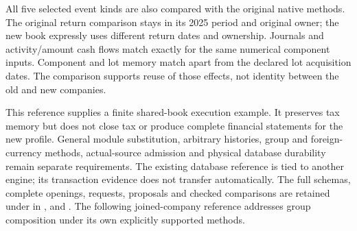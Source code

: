 All five selected event kinds are also compared with the original native
methods. The original return comparison stays in its 2025 period and original
owner; the new book expressly uses different return dates and ownership.
Journals and activity/amount cash flows match exactly for the same numerical
component inputs. Component and lot memory match apart from the declared lot
acquisition dates. The comparison supports reuse of those effects, not identity
between the old and new companies.

This reference supplies a finite shared-book execution example. It preserves
tax memory but does not close tax or produce complete financial statements for
the new profile. General module substitution, arbitrary histories, group and
foreign-currency methods, actual-source admission and physical database
durability remain separate requirements. The existing database reference is
tied to another engine; its transaction evidence does not transfer automatically.
The full schemas, complete openings, requests, proposals and checked comparisons
are retained under  in
,
 and
. The following joined-company reference
addresses group composition under its own explicitly supported methods.
